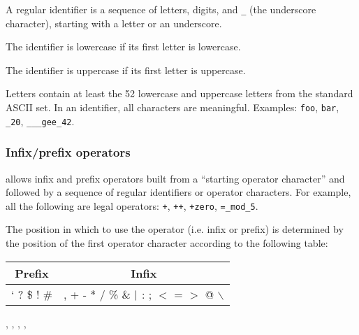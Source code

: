 A regular identifier is a sequence of letters, digits, and {\tt \_} (the
underscore character), starting with a letter or an underscore.

The identifier is lowercase if its first letter is lowercase.

The identifier is uppercase if its first letter is uppercase.

Letters contain at least the 52 lowercase and uppercase
letters from the standard ASCII set. In an identifier, all characters
are meaningful.
Examples: {\tt foo}, {\tt bar}, {\tt \_20},
{\tt \_\_\_gee\_42}.

\subsubsection{Infix/prefix operators}

{\focal} allows infix and prefix operators built from a
``starting operator character'' and followed by a sequence of
regular identifiers or operator characters. For example, all the
following are legal operators:
{\tt +}, {\tt ++}, {\tt \tilde+zero}, {\tt =\_mod\_5}.

The position in which to use the operator (i.e. infix or prefix)
is determined by the position of the first operator character
according to the following table:
\begin{center}
\begin{tabular}{|c|c|}
\hline
Prefix & Infix \\
\hline
` \tilde{} ? \$ ! \# &
, + - * / \% \& $\vertical$ : ; $<$ = $>$ @ \chapeau{} $\backslash$ \\
\hline
\end{tabular}
\end{center}

\begin{syn}
 \is
   \orelse \tok{\tilde} \orelse {} \orelse \tok{\$} \orelse
  \tok{!} \orelse \tok{\#}
\sep
{} \is
  \tok{,} \orelse \tok{+} \orelse \tok{-} \orelse \tok{*} \orelse
  \tok{/} \orelse \tok{\%} \orelse \tok{\&} \orelse \tok{\vertical} \orelse
  \tok{:} \orelse \tok{;} \orelse \tok{<} \orelse \tok{=} \orelse
  \tok{>} \orelse {} \orelse \tok{\chapeau} \orelse
  \tok{\backslash}
\sep
{} \is
   
\sep
{} \is
   
\sep
{} \is
   \orelse {}
\end{syn}

